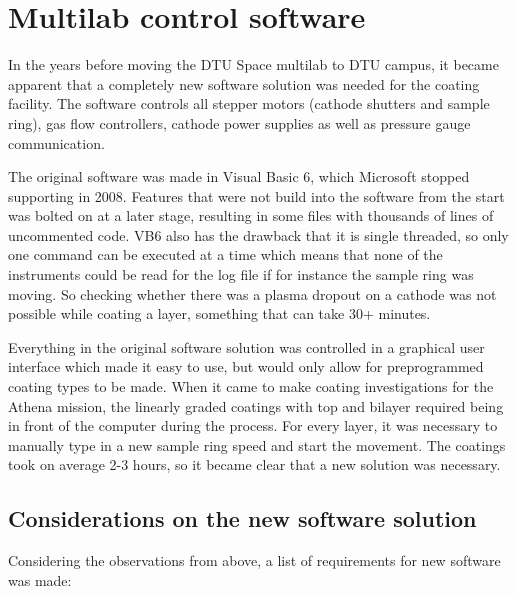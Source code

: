 \section{Multilab control software}\label{sec:ml_software}
In the years before moving the DTU Space multilab to DTU campus, it became apparent that a completely new software solution was needed for the coating facility. The software controls all stepper motors (cathode shutters and sample ring), gas flow controllers,  cathode power supplies as well as pressure gauge communication.

The original software was made in Visual Basic 6, which Microsoft stopped supporting in 2008. Features that were not build into the software from the start was bolted on at a later stage, resulting in some files with thousands of lines of uncommented code. VB6 also has the drawback that it is single threaded, so only one command can be executed at a time which means that none of the instruments could be read for the log file if for instance the sample ring was moving. So checking whether there was a plasma dropout on a cathode was not possible while coating a layer, something that can take 30+ minutes.

Everything in the original software solution was controlled in a graphical user interface which made it easy to use, but would only allow for preprogrammed coating types to be made. When it came to make coating investigations for the Athena mission, the linearly graded coatings with top and bilayer required being in front of the computer during the process. For every layer, it was necessary to manually type in a new sample ring speed and start the movement. The coatings took on average 2-3 hours, so it became clear that a new solution was necessary.

\subsection{Considerations on the new software solution}
Considering the observations from above, a list of requirements for new software was made:

